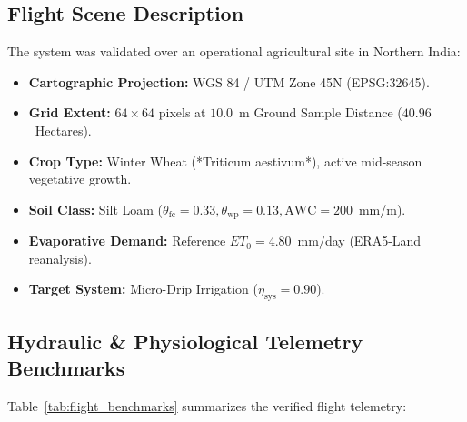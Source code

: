 \documentclass[11pt,a4paper]{article}
\theoremstyle{definition}
\theoremstyle{remark}
\begin{document}
\subsection{Flight Scene Description}
The system was validated over an operational agricultural site in Northern India:
\begin{itemize}
    \item \textbf{Cartographic Projection:} WGS 84 / UTM Zone 45N (EPSG:32645).
    \item \textbf{Grid Extent:} $64 \times 64$ pixels at $10.0$~m Ground Sample Distance ($40.96$~Hectares).
    \item \textbf{Crop Type:} Winter Wheat (*Triticum aestivum*), active mid-season vegetative growth.
    \item \textbf{Soil Class:} Silt Loam ($\theta_{\text{fc}} = 0.33, \theta_{\text{wp}} = 0.13, \text{AWC} = 200$~mm/m).
    \item \textbf{Evaporative Demand:} Reference $ET_0 = 4.80$~mm/day (ERA5-Land reanalysis).
    \item \textbf{Target System:} Micro-Drip Irrigation ($\eta_{\text{sys}} = 0.90$).
\end{itemize}

\subsection{Hydraulic \& Physiological Telemetry Benchmarks}
Table~\ref{tab:flight_benchmarks} summarizes the verified flight telemetry:
\end{document}
